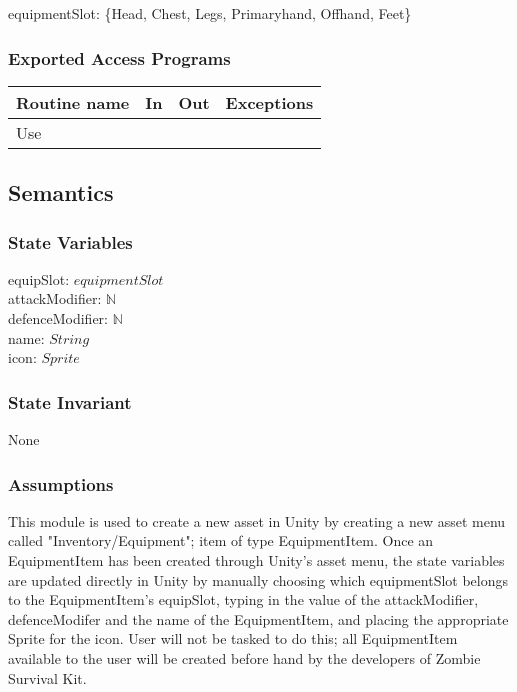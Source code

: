 \documentclass[12pt]{article}
\begin{document}
equipmentSlot: \{Head, Chest, Legs, Primaryhand, Offhand, Feet\}

\subsubsection* {Exported Access Programs}

\begin{tabular}{| l | l | l | l |}
\hline
\textbf{Routine name} & \textbf{In} & \textbf{Out} & \textbf{Exceptions}\\
\hline
Use & ~ & ~ & ~\\
\hline
\end{tabular}

\subsection* {Semantics}

\subsubsection* {State Variables}

equipSlot: $equipmentSlot$\\
attackModifier: $\mathbb{N}$\\
defenceModifier: $\mathbb{N}$\\
name: $String$\\
icon: $Sprite$

\subsubsection* {State Invariant}

None

\subsubsection* {Assumptions}

This module is used to create a new asset in Unity by creating a new asset menu called "Inventory/Equipment"; item of type EquipmentItem. Once an EquipmentItem has been created through Unity's asset menu, the state variables are updated directly in Unity by manually choosing which equipmentSlot belongs to the EquipmentItem's equipSlot, typing in the value of the attackModifier, defenceModifer and the name of the EquipmentItem, and placing the appropriate Sprite for the icon. User will not be tasked to do this; all EquipmentItem available to the user will be created before hand by the developers of Zombie Survival Kit.
\end{document}
